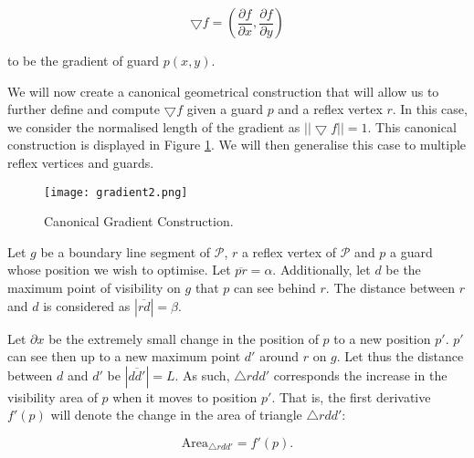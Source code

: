 \begin{equation}
    \bigtriangledown f = (\frac{\partial f}{\partial x}, \frac{\partial f}{\partial y}) \label{eq:gradient}
\end{equation}

to be the gradient of guard $p(x, y)$. 

We will now create a canonical geometrical construction that will allow us to further define and compute $\bigtriangledown f$ given a guard $p$ and a reflex vertex $r$. In this case, we consider the normalised length of the gradient as $||\bigtriangledown f|| = 1$. This canonical construction is displayed in Figure \ref{fig:gradient}. We will then generalise this case to multiple reflex vertices and guards.

\begin{figure}[h!]
    \centering
    \texttt{[image: gradient2.png]}
    \caption{Canonical Gradient Construction.}
    \label{fig:gradient}
\end{figure}

Let $g$ be a boundary line segment of $\mathcal P$, $r$ a reflex vertex of $\mathcal P$ and $p$ a guard whose position we wish to optimise. Let $\overline{pr} = \alpha$. Additionally, let $d$ be the maximum point of visibility on $g$ that $p$ can see behind $r$. The distance between $r$ and $d$ is considered as $|\overline{rd}| = \beta$. 



Let $\partial x$ be the extremely small change in the position of $p$ to a new position $p'$. $p'$ can see then up to a new maximum point $d'$ around $r$ on $g$. Let thus the distance between $d$ and $d'$ be $|\overline{dd'}| = L$. As such, $\triangle rdd'$ corresponds the increase in the visibility area of $p$ when it moves to position $p'$. That is, the first derivative $f'(p)$ will denote the change in the area of triangle $\triangle rdd'$:

\begin{equation}
    \text{Area}_{\triangle rdd'} = f'(p). \label{eq:derivative}
\end{equation}






